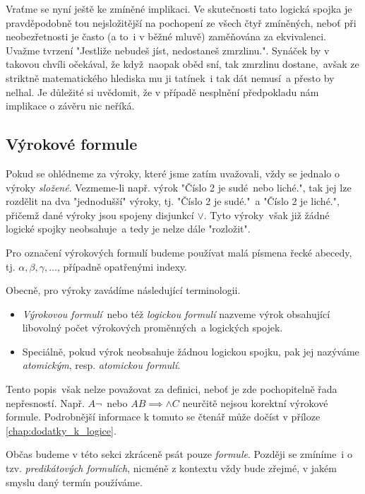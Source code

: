 Vraťme se nyní ještě ke zmíněné implikaci. Ve skutečnosti tato logická spojka je pravděpodobně tou nejsložitější na pochopení ze všech čtyř zmíněných, neboť při neobezřetnosti je často (a to~i v běžné mluvě) zaměňována za ekvivalenci. Uvažme tvrzení "Jestliže nebudeš jíst, nedostaneš zmrzlinu.". Synáček by v takovou chvíli očekával, že když~naopak oběd sní, tak zmrzlinu dostane,~avšak ze striktně matematického hlediska mu ji tatínek~i tak dát nemusí~a přesto by nelhal. Je důležité si uvědomit, že v případě nesplnění předpokladu nám implikace o závěru nic neříká.\par

\subsection{Výrokové formule}
Pokud se ohlédneme za výroky, které jsme zatím uvažovali, vždy se jednalo o výroky \emph{složené}. Vezmeme-li např. výrok "Číslo 2 je sudé~nebo liché.", tak jej lze rozdělit na dva "jednodušší" výroky, tj. "Číslo 2 je sudé."~a "Číslo 2 je liché.", přičemž dané výroky jsou spojeny disjunkcí $\lor$. Tyto výroky~však již žádné logické spojky neobsahuje~a tedy je nelze dále "rozložit".
\begin{convention}
    Pro označení výrokových formulí budeme používat malá písmena řecké abecedy, tj. $\alpha,\beta,\gamma,\dots$, případně opatřenými indexy.
\end{convention}
Obecně, pro výroky zavádíme následující terminologii.
\begin{itemize}
    \item \emph{Výrokovou formulí}~nebo též \emph{logickou formulí} nazveme výrok obsahující libovolný počet výrokových proměnných~a logických spojek.
    \item Speciálně, pokud výrok neobsahuje žádnou logickou spojku, pak jej nazýváme \emph{atomickým}, resp. \emph{atomickou formulí}.
\end{itemize}
Tento popis~však nelze považovat za definici, neboť je zde pochopitelně řada nepřesností. Např. $A\neg$~nebo $AB\implies\land C$ neurčitě nejsou korektní výrokové formule. Podrobnější informace k tomuto se čtenář může dočíst v příloze \ref{chap:dodatky_k_logice}.
\begin{remark}
    Občas budeme v této sekci zkráceně psát pouze \emph{formule}. Později se zmíníme~i o tzv. \emph{predikátových formulích}, nicméně z kontextu vždy bude zřejmé, v jakém smyslu daný termín používáme.
\end{remark}
